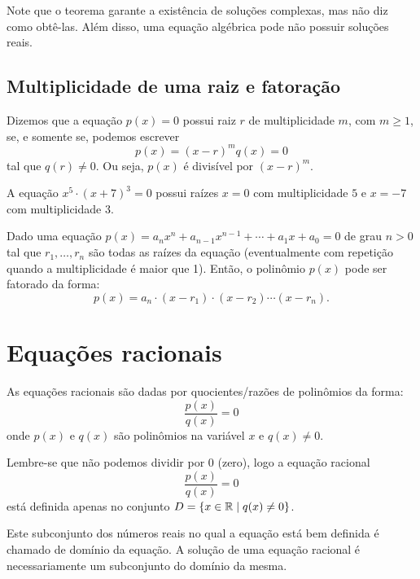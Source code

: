 Note que o teorema garante a existência de soluções complexas, mas não diz como obtê-las. Além disso, uma equação algébrica pode não possuir soluções reais.

\subsection{Multiplicidade de uma raiz e fatoração}

Dizemos que a equação $p(x)=0$ possui raiz $r$ de multiplicidade $m$, com $m\geqslant 1$, se, e somente se, podemos escrever
\begin{equation*}
    p(x)=(x-r)^m q(x) =0
\end{equation*}
tal que $q(r)\neq 0$. Ou seja, $p(x)$ é divisível por $(x-r)^m$.

\begin{exem}
    A equação $x^5\cdot (x+7)^3 = 0$ possui raízes $x=0$ com multiplicidade $5$ e $x=-7$ com multiplicidade 3.
\end{exem}

\begin{obs}
    Dado uma equação $p(x)=a_n x^n+a_{n-1} x^{n-1}+\cdots+ a_1 x+a_0=0$ de grau $n>0$ tal que $r_1,\dots,r_n$ são todas as raízes da equação (eventualmente com repetição quando a multiplicidade é maior que 1). Então, o polinômio $p(x)$ pode ser fatorado da forma:
    \begin{equation*}
        p(x)=a_n\cdot (x-r_1)\cdot (x-r_2) \cdots (x-r_n).
    \end{equation*}
\end{obs}

 \section{Equações racionais}

 \begin{obs}
  As equações racionais são dadas por quocientes/razões de polinômios da forma:
  \[\dfrac{p(x)}{q(x)}= 0\]
  onde $p(x)$ e $q(x)$ são polinômios na variável $x$ e $q(x) \neq 0$.
 \end{obs}
 
 Lembre-se que não podemos dividir por $0$ (zero), logo a equação racional
 \[\dfrac{p(x)}{q(x)}= 0\]
 está definida apenas no conjunto $D= \{x \in \mathbb{R} \mid q(x) \neq 0\}$.
 
 Este subconjunto dos números reais no qual a equação está bem definida é chamado de domínio da equação. A solução de uma equação racional é necessariamente um subconjunto do domínio da mesma.
 
